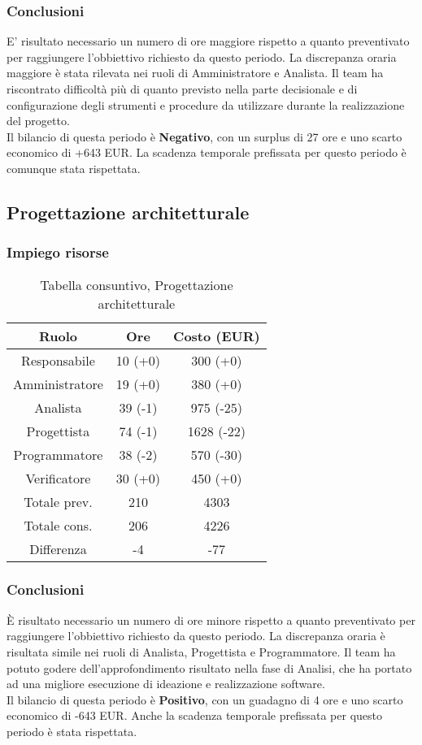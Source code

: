 \subsubsection{Conclusioni}
E' risultato necessario un numero di ore maggiore rispetto a quanto preventivato per raggiungere l'obbiettivo richiesto da questo periodo. La discrepanza oraria maggiore è stata rilevata nei ruoli di Amministratore e Analista. Il team ha riscontrato difficoltà più di quanto previsto nella parte decisionale e di configurazione degli strumenti e procedure da utilizzare durante la realizzazione del progetto.
\\Il bilancio di questa periodo è \textbf{Negativo}, con un surplus di 27 ore e uno scarto economico di +643 EUR. La scadenza temporale prefissata per questo periodo è comunque stata rispettata.
\subsection{Progettazione architetturale}
\subsubsection{Impiego risorse}
\begin{table}[h]
\caption{Tabella consuntivo, Progettazione architetturale}  
\begin{center}
\begin{tabular}{ |c|c|c|  }
 \hline
 Ruolo 		& Ore & Costo (EUR)\\
 \hline\hline
	Responsabile	& 10 (+0) & 300 (+0)\\
	Amministratore	& 19 (+0) & 380 (+0)\\
	Analista		& 39 (-1) & 975 (-25)\\
	Progettista		& 74 (-1) & 1628 (-22)\\
	Programmatore	& 38 (-2) & 570 (-30)\\
	Verificatore	& 30 (+0) & 450 (+0)\\
	\hline\hline
	Totale prev.	& 210 & 4303 \\
	Totale cons.	& 206 & 4226 \\
	Differenza		& -4 & -77 \\
 \hline
\end{tabular}
\end{center}
\end{table}
\subsubsection{Conclusioni}
È risultato necessario un numero di ore minore rispetto a quanto preventivato per raggiungere l'obbiettivo richiesto da questo periodo. La discrepanza oraria è risultata simile nei ruoli di Analista, Progettista e Programmatore. Il team ha potuto godere dell'approfondimento risultato nella fase di Analisi, che ha portato ad una migliore esecuzione di ideazione e realizzazione software.
\\Il bilancio di questa periodo è \textbf{Positivo}, con un guadagno di 4 ore e uno scarto economico di -643 EUR. Anche la scadenza temporale prefissata per questo periodo è stata rispettata.
